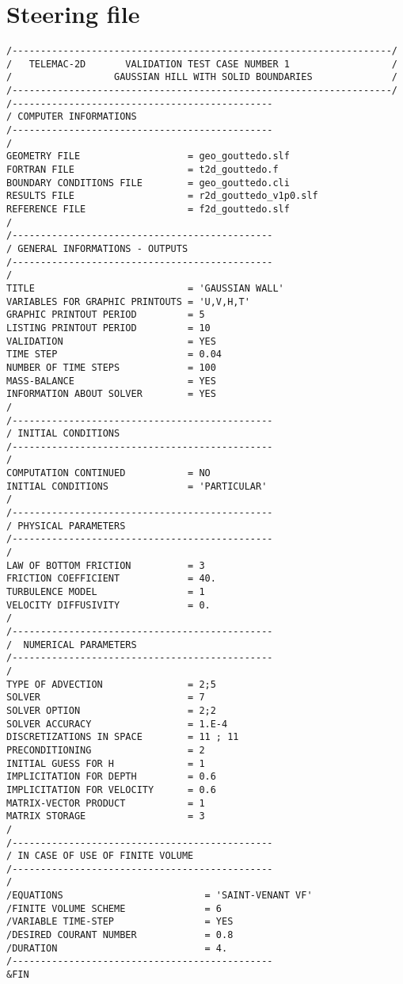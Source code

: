 \section{ Steering file}
\begin{lstlisting}[language=TelemacCas]
/-------------------------------------------------------------------/
/   TELEMAC-2D       VALIDATION TEST CASE NUMBER 1                  /
/                  GAUSSIAN HILL WITH SOLID BOUNDARIES              /
/-------------------------------------------------------------------/
/----------------------------------------------
/ COMPUTER INFORMATIONS
/----------------------------------------------
/
GEOMETRY FILE                   = geo_gouttedo.slf
FORTRAN FILE                    = t2d_gouttedo.f
BOUNDARY CONDITIONS FILE        = geo_gouttedo.cli
RESULTS FILE                    = r2d_gouttedo_v1p0.slf
REFERENCE FILE                  = f2d_gouttedo.slf
/
/----------------------------------------------
/ GENERAL INFORMATIONS - OUTPUTS
/----------------------------------------------
/
TITLE                           = 'GAUSSIAN WALL'
VARIABLES FOR GRAPHIC PRINTOUTS = 'U,V,H,T'
GRAPHIC PRINTOUT PERIOD         = 5
LISTING PRINTOUT PERIOD         = 10
VALIDATION                      = YES
TIME STEP                       = 0.04
NUMBER OF TIME STEPS            = 100
MASS-BALANCE                    = YES
INFORMATION ABOUT SOLVER        = YES
/
/----------------------------------------------
/ INITIAL CONDITIONS
/----------------------------------------------
/
COMPUTATION CONTINUED           = NO
INITIAL CONDITIONS              = 'PARTICULAR'
/
/----------------------------------------------
/ PHYSICAL PARAMETERS
/----------------------------------------------
/
LAW OF BOTTOM FRICTION          = 3
FRICTION COEFFICIENT            = 40.
TURBULENCE MODEL                = 1
VELOCITY DIFFUSIVITY            = 0.
/
/----------------------------------------------
/  NUMERICAL PARAMETERS
/----------------------------------------------
/
TYPE OF ADVECTION               = 2;5
SOLVER                          = 7
SOLVER OPTION                   = 2;2
SOLVER ACCURACY                 = 1.E-4
DISCRETIZATIONS IN SPACE        = 11 ; 11
PRECONDITIONING                 = 2
INITIAL GUESS FOR H             = 1
IMPLICITATION FOR DEPTH         = 0.6
IMPLICITATION FOR VELOCITY      = 0.6
MATRIX-VECTOR PRODUCT           = 1
MATRIX STORAGE                  = 3
/
/----------------------------------------------
/ IN CASE OF USE OF FINITE VOLUME
/----------------------------------------------
/
/EQUATIONS                         = 'SAINT-VENANT VF'
/FINITE VOLUME SCHEME              = 6
/VARIABLE TIME-STEP                = YES
/DESIRED COURANT NUMBER            = 0.8
/DURATION                          = 4.
/----------------------------------------------
&FIN
\end{lstlisting}
